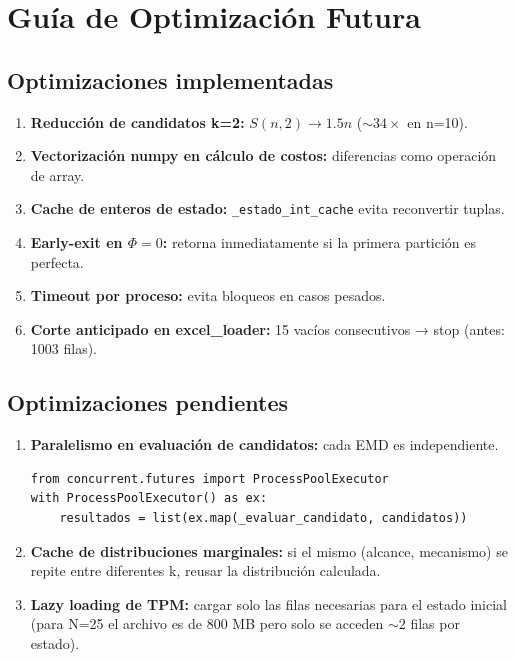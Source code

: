 \documentclass[12pt,a4paper]{article}
\begin{document}
\section{Guía de Optimización Futura}

\subsection{Optimizaciones implementadas}
\begin{enumerate}
    \item \textbf{Reducción de candidatos k=2:} $S(n,2) \to 1.5n$ ($\sim 34\times$ en n=10).
    \item \textbf{Vectorización numpy en cálculo de costos:} diferencias como operación de array.
    \item \textbf{Cache de enteros de estado:} \texttt{\_estado\_int\_cache} evita reconvertir tuplas.
    \item \textbf{Early-exit en $\Phi=0$:} retorna inmediatamente si la primera partición es perfecta.
    \item \textbf{Timeout por proceso:} evita bloqueos en casos pesados.
    \item \textbf{Corte anticipado en excel\_loader:} 15 vacíos consecutivos → stop (antes: 1003 filas).
\end{enumerate}

\subsection{Optimizaciones pendientes}
\begin{enumerate}
    \item \textbf{Paralelismo en evaluación de candidatos:} cada EMD es independiente.
\begin{lstlisting}
from concurrent.futures import ProcessPoolExecutor
with ProcessPoolExecutor() as ex:
    resultados = list(ex.map(_evaluar_candidato, candidatos))
\end{lstlisting}
    \item \textbf{Cache de distribuciones marginales:} si el mismo (alcance, mecanismo) se repite entre diferentes k, reusar la distribución calculada.
    \item \textbf{Lazy loading de TPM:} cargar solo las filas necesarias para el estado inicial (para N=25 el archivo es de 800 MB pero solo se acceden $\sim 2$ filas por estado).
\end{enumerate}
\end{document}
